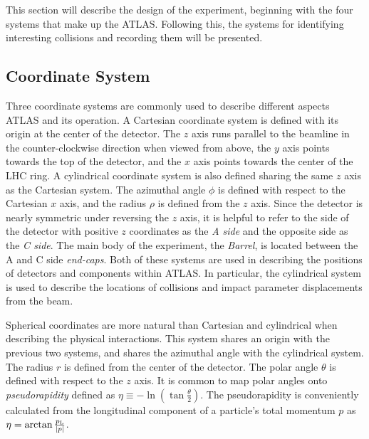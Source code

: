 This section will describe the design of the experiment, beginning with the four systems that make up the ATLAS.
Following this, the systems for identifying interesting collisions and recording them will be presented.

\subsection{Coordinate System}

Three coordinate systems are commonly used to describe different aspects ATLAS and its operation. 
A Cartesian coordinate system is defined with its origin at the center of the detector.
The $z$ axis runs parallel to the beamline in the counter-clockwise direction when viewed from above, the $y$ axis points towards the top of the detector, and the $x$ axis points towards the center of the LHC ring.
A cylindrical coordinate system is also defined sharing the same $z$ axis as the Cartesian system.
The azimuthal angle $\phi$ is defined with respect to the Cartesian $x$ axis, and the radius $\rho$ is defined from the $z$ axis.
Since the detector is nearly symmetric under reversing the $z$ axis, it is helpful to refer to the side of the detector with positive $z$ coordinates as the \emph{A side} and the opposite side as the \emph{C side}.
The main body of the experiment, the \emph{Barrel}, is located between the A and C side \emph{end-caps}.
Both of these systems are used in describing the positions of detectors and components within ATLAS.
In particular, the cylindrical system is used to describe the locations of collisions and impact parameter displacements from the beam.

Spherical coordinates are more natural than Cartesian and cylindrical when describing the physical interactions.
This system shares an origin with the previous two systems, and shares the azimuthal angle with the cylindrical system.
The radius $r$ is defined from the center of the detector.
The polar angle $\theta$ is defined with respect to the $z$ axis.
It is common to map polar angles onto \emph{pseudorapidity} defined as $\eta\equiv-\ln(\tan\frac{\theta}{2})$.
The pseudorapidity is conveniently calculated from the longitudinal component \plong of a particle's total momentum $p$ as $\eta=\arctan{\frac{\ensuremath{p_\text{L}}}{|p|}}$.


